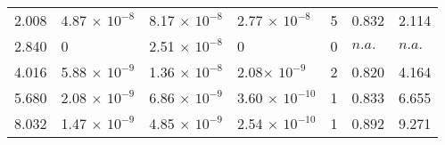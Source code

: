 \begin{tabular}{lllllll}
2.008 & 4.87 $\times$ $10^{-8}$ 	& 8.17 $\times$ $10^{-8}$  & 2.77 $\times$ $10^{-8}$  & 5 & 0.832 & 2.114 \\
2.840 & 0	& 2.51 $\times$ $10^{-8}$  & 0 & 0 & $n.a.$ & $n.a.$ \\
4.016 & 5.88 $\times$ $10^{-9}$ 	& 1.36 $\times$ $10^{-8}$  & 2.08$\times$ $10^{-9}$  & 2 & 0.820 & 4.164 \\	
5.680 & 2.08 $\times$ $10^{-9}$ 	& 6.86 $\times$ $10^{-9}$  & 3.60 $\times$ $10^{-10}$  & 1 & 0.833 & 6.655 \\
8.032 & 1.47 $\times$ $10^{-9}$ 	& 4.85 $\times$ $10^{-9}$  & 2.54 $\times$ $10^{-10}$  & 1 & 0.892 & 9.271 \\
\end{tabular}
